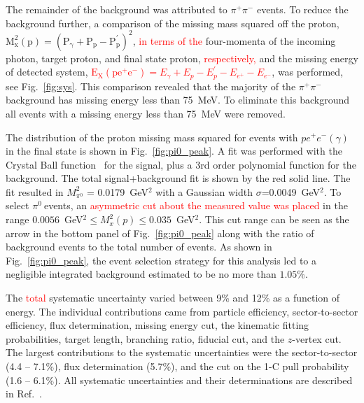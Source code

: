 \documentclass[aps,prc,twocolumn,floatfix,showpacs,preprintnumbers,amsmath,amssymb,superscriptaddress,linenumbers]{revtex4-1}
\def\pizT{$\pi^{0} \ $}
\begin{document}
The remainder of the background was attributed to $\pi^+\pi^-$
events. To reduce the background further, a comparison of the 
missing mass squared off the proton, $\mathrm{M_x^2(p) =(P_\gamma + P_p -P^{'}_p)^2}$, \textcolor{red}{in terms of the} four-momenta of the incoming photon, target proton, and final state proton, \textcolor{red}{respectively,} and the missing energy of detected system, \textcolor{red}{$\mathrm{E_X(pe^+e^-)}= E_\gamma + E_p  -  E^{'}_p - E_{e^{+}} - E_{e^{-}} $}, was performed, see Fig.~\ref{fig:sys}. This 
comparison revealed that the majority of the $\pi^+\pi^-$ background 
has missing energy less than 75~MeV. To eliminate this background 
all events with a missing energy less than 75~MeV were removed.

The distribution of the proton missing mass squared for events with 
$pe^+e^-(\gamma)$ in the final state is shown in Fig.~\ref{fig:pi0_peak}. 
A fit was performed with the Crystal Ball function~\cite{Oreglia:1980cs,
Skwarnicki:1986xj} for the signal, plus a 3rd order polynomial function 
for the background. The total signal+background fit is shown by the red solid 
line. The fit resulted in $M_{\pi^0}^2$ = 0.0179~GeV$^2$ with a Gaussian width
$\sigma$=0.0049~GeV$^2$. To select \pizT events, an \textcolor{red}{asymmetric cut about the measured value was placed} 
in the range $0.0056 $~GeV$^2 \le  M_x^2(p) 
\le 0.035$~GeV$^2$. This cut range can be seen as the arrow in the bottom 
panel of Fig.~\ref{fig:pi0_peak} along with the ratio of background 
events to the total number of events. As shown in Fig.~\ref{fig:pi0_peak}, 
the event selection strategy for this analysis led to a 
negligible integrated background estimated to be no more than $1.05\%$.

The \textcolor{red}{total} systematic uncertainty varied between 9\% and 12\% as a function of energy. The individual contributions came from particle efficiency, sector-to-sector efficiency, 
flux determination, missing energy cut, the kinematic fitting probabilities, 
target length, branching ratio, fiducial cut, and the $z$-vertex cut.
The largest contributions to the systematic uncertainties 
were the sector-to-sector (4.4 -- 7.1\%), flux determination (5.7\%),
and the cut on the 1-C pull probability (1.6 -- 6.1\%). All systematic 
uncertainties and their determinations are described in Ref.~\cite{Kunkel}.

\end{document}
